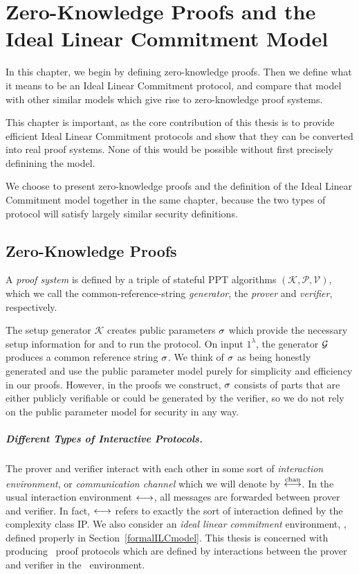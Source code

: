 \chapter{Zero-Knowledge Proofs and the Ideal Linear Commitment Model}
\label{chapterlabel:Models}

In this chapter, we begin by defining zero-knowledge proofs. Then we define what it means to be an Ideal Linear Commitment protocol, and compare that model with other similar models which give rise to zero-knowledge proof systems.

This chapter is important, as the core contribution of this thesis is to provide efficient Ideal Linear Commitment protocols and show that they can be converted into real proof systems. None of this would be possible without first precisely definining the model.

We choose to present zero-knowledge proofs and the definition of the Ideal Linear Commitment model together in the same chapter, because the two types of protocol will satisfy largely similar security definitions.

\section{Zero-Knowledge Proofs}
\label{shvzkdef}

A \emph{proof system} is defined by a triple of stateful PPT algorithms $(\mathcal{K},\mathcal{P},\mathcal{V})$, which we call the common-reference-string \emph{generator}, the \emph{prover} and \emph{verifier}, respectively.

The setup generator $\mathcal{K}$ creates public parameters $\mathsf{\sigma}$ which provide the necessary setup information for \prover and \verifier to run the protocol. On input $1^\lambda$, the generator $\mathcal{G}$ produces a common reference string $\mathsf{\sigma}$. We think of $\mathsf{\sigma}$ as being honestly generated and use the public parameter model purely for simplicity and efficiency in our proofs. However, in the proofs we construct, $\mathsf{\sigma}$ consists of parts that are either publicly verifiable or could be generated by the verifier, so we do not rely on the public parameter model for security in any way.

\paragraph{Different Types of Interactive Protocols.} The prover and verifier interact with each other in some sort of \emph{interaction environment}, or \emph{communication channel} which we will denote by $\overset{\textnormal{chan}}{\longleftrightarrow}$. In the usual interaction environment $\longleftrightarrow$, all messages are forwarded between prover and verifier. In fact, $\longleftrightarrow$ refers to exactly the sort of interaction defined by the complexity class IP. We also consider an \emph{ideal linear commitment} environment, \ILC, defined properly in Section~\ref{formalILCmodel}. This thesis is concerned with producing \ILC\ proof protocols which are defined by interactions between the prover and verifier in the \ILC\ environment.

